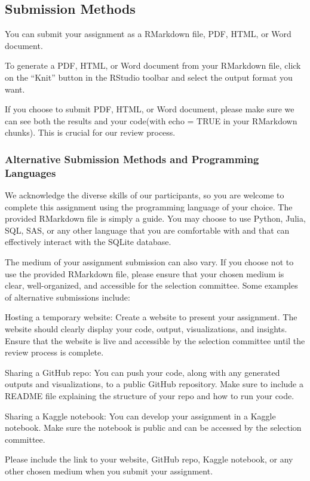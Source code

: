 \documentclass[
]{article}
\begin{document}
\newpage

\hypertarget{submission-methods}{%
\subsection{Submission Methods}\label{submission-methods}}

You can submit your assignment as a RMarkdown file, PDF, HTML, or Word
document.

To generate a PDF, HTML, or Word document from your RMarkdown file,
click on the ``Knit'' button in the RStudio toolbar and select the
output format you want.

If you choose to submit PDF, HTML, or Word document, please make sure we
can see both the results and your code(with echo = TRUE in your
RMarkdown chunks). This is crucial for our review process.

\hypertarget{alternative-submission-methods-and-programming-languages}{%
\subsubsection{Alternative Submission Methods and Programming
Languages}\label{alternative-submission-methods-and-programming-languages}}

We acknowledge the diverse skills of our participants, so you are
welcome to complete this assignment using the programming language of
your choice. The provided RMarkdown file is simply a guide. You may
choose to use Python, Julia, SQL, SAS, or any other language that you
are comfortable with and that can effectively interact with the SQLite
database.

The medium of your assignment submission can also vary. If you choose
not to use the provided RMarkdown file, please ensure that your chosen
medium is clear, well-organized, and accessible for the selection
committee. Some examples of alternative submissions include:

Hosting a temporary website: Create a website to present your
assignment. The website should clearly display your code, output,
visualizations, and insights. Ensure that the website is live and
accessible by the selection committee until the review process is
complete.

Sharing a GitHub repo: You can push your code, along with any generated
outputs and visualizations, to a public GitHub repository. Make sure to
include a README file explaining the structure of your repo and how to
run your code.

Sharing a Kaggle notebook: You can develop your assignment in a Kaggle
notebook. Make sure the notebook is public and can be accessed by the
selection committee.

Please include the link to your website, GitHub repo, Kaggle notebook,
or any other chosen medium when you submit your assignment.
\end{document}
